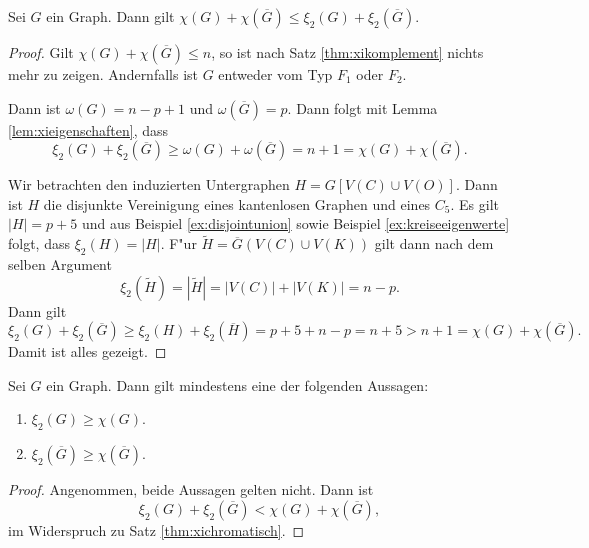 \begin{theorem}
  Sei $G$ ein Graph. Dann gilt $\chi(G) + \chi(\overline{G}) \leq \xi_{2}(G) +  \xi_{2}(\overline{G})$.
  \label{thm:xichromatisch}
\end{theorem}
\begin{proof}
  Gilt $\chi(G) + \chi(\overline{G}) \leq n$, so ist nach Satz \ref{thm:xikomplement} nichts mehr zu zeigen. Andernfalls ist $G$ entweder vom Typ $F_1$ oder $F_2$. 

   Dann ist $\omega(G) = n-p+1$ und $\omega (\overline{G})=p$. Dann folgt mit Lemma \ref{lem:xieigenschaften}, dass 
  $$\xi_{2}(G) + \xi_{2}(\overline{G}) \geq \omega(G) + \omega(\overline{G}) = n+ 1 = \chi(G) + \chi(\overline{G}).$$

   Wir betrachten den induzierten Untergraphen $H=G[V(C) \cup V(O)]$. Dann ist $H$ die disjunkte Vereinigung eines kantenlosen Graphen und eines $C_5$. Es gilt $|H| = p+5$ und aus Beispiel \ref{ex:disjointunion} sowie Beispiel \ref{ex:kreiseeigenwerte} folgt, dass $\xi_{2}(H) = |H|$. 
  F"ur $\tilde{H} = \overline{G} (V(C) \cup V(K))$ gilt dann nach dem selben Argument $$\xi_{2}(\tilde{H}) = |\tilde{H}| = |V(C)| + |V(K)| = n-p .$$ Dann gilt 
  $$\xi_{2}(G) + \xi_{2}(\overline{G}) \geq \xi_{2}(H) + \xi_{2}(\overline{H}) = p+5 + n -p = n+ 5 > n+ 1 = \chi(G) + \chi(\overline{G}).$$
  Damit ist alles gezeigt.
\end{proof}

\begin{corollary}
  Sei $G$ ein Graph. Dann gilt mindestens eine der folgenden Aussagen:
  \begin{enumerate}[label=\rm{(\alph*)}]
    \item $\xi_2(G) \geq \chi(G)$.
    \item $\xi_{2}(\overline{G}) \geq \chi(\overline{G})$.
  \end{enumerate}
\end{corollary}

\begin{proof}
  Angenommen, beide Aussagen gelten nicht. Dann ist 
  $$\xi_2(G) + \xi_{2}(\overline{G}) < \chi(G) + \chi(\overline{G}), $$
  im Widerspruch zu Satz \ref{thm:xichromatisch}.
\end{proof}

